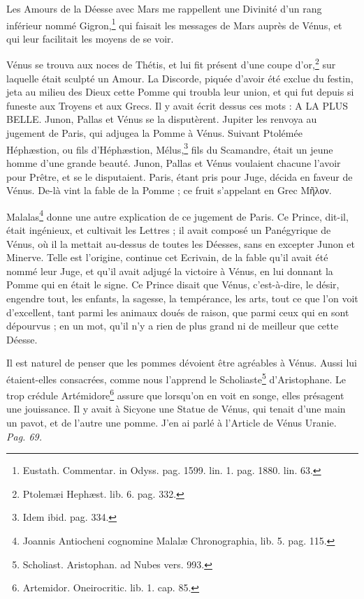 \documentclass[a4paper, 11pt, oneside, polutonikogreek, french]{article}
\begin{document}
Les Amours de la Déesse avec Mars me rappellent une Divinité d'un rang inférieur nommé Gigron,\footnote{Eustath. Commentar. in Odyss. pag. 1599. lin. 1. pag. 1880. lin. 63.} qui faisait les messages de Mars auprès de Vénus, et qui leur facilitait les moyens de se voir.

Vénus se trouva aux noces de Thétis, et lui fit présent d'une coupe d'or,\footnote{Ptolemæi Hephæst. lib. 6. pag. 332.} sur laquelle était sculpté un Amour. La Discorde, piquée d'avoir été exclue du festin, jeta au milieu des Dieux cette Pomme qui troubla leur union, et qui fut depuis si funeste aux Troyens et aux Grecs. Il y avait écrit dessus ces mots : A LA PLUS BELLE. Junon, Pallas et Vénus se la disputèrent. Jupiter les renvoya au jugement de Paris, qui adjugea la Pomme à Vénus. Suivant Ptolémée Héphæstion, ou fils d'Héphæstion, Mélus,\footnote{Idem ibid. pag. 334.} fils du Scamandre, était un jeune homme d'une grande beauté. Junon, Pallas et Vénus voulaient chacune l'avoir pour Prêtre, et se le disputaient. Paris, étant pris pour Juge, décida en faveur de Vénus. De-là vint la fable de la Pomme ; ce fruit s'appelant en Grec Μῆλον.

Malalas\footnote{Joannis Antiocheni cognomine Malalæ Chronographia, lib. 5. pag. 115.} donne une autre explication de ce jugement de Paris. Ce Prince, dit-il, était ingénieux, et cultivait les Lettres ; il avait composé un Panégyrique de Vénus, où il la mettait au-dessus de toutes les Déesses, sans en excepter Junon et Minerve. Telle est l'origine, continue cet Ecrivain, de la fable qu'il avait été nommé leur Juge, et qu'il avait adjugé la victoire à Vénus, en lui donnant la Pomme qui en était le signe. Ce Prince disait que Vénus, c'est-à-dire, le désir, engendre tout, les enfants, la sagesse, la tempérance, les arts, tout ce que l'on voit d'excellent, tant parmi les animaux doués de raison, que parmi ceux qui en sont dépourvus ; en un mot, qu'il n'y a rien de plus grand ni de meilleur que cette Déesse.

Il est naturel de penser que les pommes dévoient être agréables à Vénus. Aussi lui étaient-elles consacrées, comme nous l'apprend le Scholiaste\footnote{Scholiast. Aristophan. ad Nubes vers. 993.} d'Aristophane. Le trop crédule Artémidore\footnote{Artemidor. Oneirocritic. lib. 1. cap. 85.} assure que lorsqu'on en voit en songe, elles présagent une jouissance. Il y avait à Sicyone une Statue de Vénus, qui tenait d'une main un pavot, et de l'autre une pomme. J'en ai parlé à l'Article de Vénus Uranie. \emph{Pag. 69.}
\end{document}
